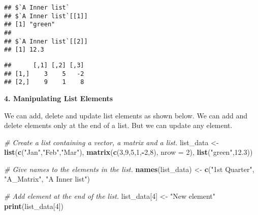 \documentclass[
]{article}
\newenvironment{Shaded}{\begin{snugshade}}{\end{snugshade}}
\newcommand{\AttributeTok}[1]{\textcolor[rgb]{0.13,0.29,0.53}{#1}}
\newcommand{\CommentTok}[1]{\textcolor[rgb]{0.56,0.35,0.01}{\textit{#1}}}
\newcommand{\DecValTok}[1]{\textcolor[rgb]{0.00,0.00,0.81}{#1}}
\newcommand{\FloatTok}[1]{\textcolor[rgb]{0.00,0.00,0.81}{#1}}
\newcommand{\FunctionTok}[1]{\textcolor[rgb]{0.13,0.29,0.53}{\textbf{#1}}}
\newcommand{\NormalTok}[1]{#1}
\newcommand{\OtherTok}[1]{\textcolor[rgb]{0.56,0.35,0.01}{#1}}
\newcommand{\SpecialCharTok}[1]{\textcolor[rgb]{0.81,0.36,0.00}{\textbf{#1}}}
\newcommand{\StringTok}[1]{\textcolor[rgb]{0.31,0.60,0.02}{#1}}
\begin{document}
\begin{verbatim}
## $`A Inner list`
## $`A Inner list`[[1]]
## [1] "green"
## 
## $`A Inner list`[[2]]
## [1] 12.3
\end{verbatim}

\begin{Shaded}
\end{Shaded}

\begin{verbatim}
##      [,1] [,2] [,3]
## [1,]    3    5   -2
## [2,]    9    1    8
\end{verbatim}

\textbf{4. Manipulating List Elements}

We can add, delete and update list elements as shown below. We can add
and delete elements only at the end of a list. But we can update any
element.

\begin{Shaded}
\begin{Highlighting}[]
\CommentTok{\# Create a list containing a vector, a matrix and a list.}
\NormalTok{list\_data }\OtherTok{\textless{}{-}} \FunctionTok{list}\NormalTok{(}\FunctionTok{c}\NormalTok{(}\StringTok{"Jan"}\NormalTok{,}\StringTok{"Feb"}\NormalTok{,}\StringTok{"Mar"}\NormalTok{), }\FunctionTok{matrix}\NormalTok{(}\FunctionTok{c}\NormalTok{(}\DecValTok{3}\NormalTok{,}\DecValTok{9}\NormalTok{,}\DecValTok{5}\NormalTok{,}\DecValTok{1}\NormalTok{,}\SpecialCharTok{{-}}\DecValTok{2}\NormalTok{,}\DecValTok{8}\NormalTok{), }\AttributeTok{nrow =} \DecValTok{2}\NormalTok{),}
   \FunctionTok{list}\NormalTok{(}\StringTok{"green"}\NormalTok{,}\FloatTok{12.3}\NormalTok{))}

\CommentTok{\# Give names to the elements in the list.}
\FunctionTok{names}\NormalTok{(list\_data) }\OtherTok{\textless{}{-}} \FunctionTok{c}\NormalTok{(}\StringTok{"1st Quarter"}\NormalTok{, }\StringTok{"A\_Matrix"}\NormalTok{, }\StringTok{"A Inner list"}\NormalTok{)}

\CommentTok{\# Add element at the end of the list.}
\NormalTok{list\_data[}\DecValTok{4}\NormalTok{] }\OtherTok{\textless{}{-}} \StringTok{"New element"}
\FunctionTok{print}\NormalTok{(list\_data[}\DecValTok{4}\NormalTok{])}
\end{Highlighting}
\end{Shaded}
\end{document}

